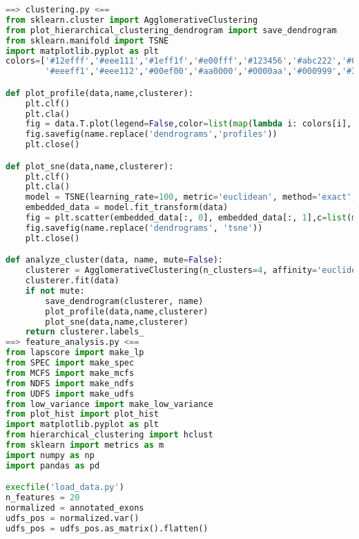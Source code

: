  
\lstset{style=mystyle}


\begin{lstlisting}[columns=fullflexible,language=Python]
==> clustering.py <==
from sklearn.cluster import AgglomerativeClustering
from plot_hierarchical_clustering_dendrogram import save_dendrogram
from sklearn.manifold import TSNE
import matplotlib.pyplot as plt
colors=['#12efff','#eee111','#1eff1f','#e00fff','#123456','#abc222','#000000','#123fff','#1eff1f','#2edf4f','#2eaf9f','#22222f'
        '#eeeff1','#eee112','#00ef00','#aa0000','#0000aa','#000999','#32efff','#23ef68','#2e3f56','#7eef1f','#eeef11']

def plot_profile(data,name,clusterer):
    plt.clf()
    plt.cla()
    fig = data.T.plot(legend=False,color=list(map(lambda i: colors[i], clusterer.labels_))).get_figure()
    fig.savefig(name.replace('dendrograms','profiles'))
    plt.close()

def plot_sne(data,name,clusterer):
    plt.clf()
    plt.cla()
    model = TSNE(learning_rate=100, metric='euclidean', method='exact', perplexity=9, early_exaggeration=1)
    embedded_data = model.fit_transform(data)
    fig = plt.scatter(embedded_data[:, 0], embedded_data[:, 1],c=list(map(lambda i: colors[i], clusterer.labels_))).get_figure()
    fig.savefig(name.replace('dendrograms', 'tsne'))
    plt.close()

def analyze_cluster(data, name, mute=False):
    clusterer = AgglomerativeClustering(n_clusters=4, affinity='euclidean')
    clusterer.fit(data)
    if not mute:
        save_dendrogram(clusterer, name)
        plot_profile(data,name,clusterer)
        plot_sne(data,name,clusterer)
    return clusterer.labels_
==> feature_analysis.py <==
from lapscore import make_lp
from SPEC import make_spec
from MCFS import make_mcfs
from NDFS import make_ndfs
from UDFS import make_udfs
from low_variance import make_low_variance
from plot_hist import plot_hist
import matplotlib.pyplot as plt
from hierarchical_clustering import hclust
from sklearn import metrics as m
import numpy as np
import pandas as pd

execfile('load_data.py')
n_features = 20
normalized = annotated_exons
udfs_pos = normalized.var()
udfs_pos = udfs_pos.as_matrix().flatten()


\end{lstlisting}
